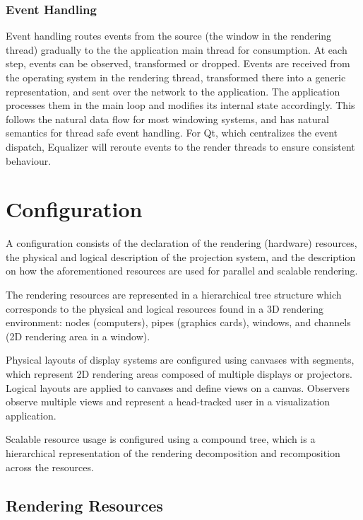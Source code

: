 \subsubsection{Event Handling}

Event handling routes events from the source (the window in the rendering
thread) gradually to the the application main thread for consumption. At each
step, events can be observed, transformed or dropped. Events are received from
the operating system in the rendering thread, transformed there into a generic
representation, and sent over the network to the application. The application
processes them in the main loop and modifies its internal state accordingly.
This follows the natural data flow for most windowing systems, and has natural
semantics for thread safe event handling. For Qt, which centralizes the event
dispatch, Equalizer will reroute events to the render threads to ensure
consistent behaviour.


\section{Configuration}

A configuration consists of the declaration of the rendering (hardware)
resources, the physical and logical  description of the projection system, and
the description on how the  aforementioned resources are used for parallel and
scalable rendering.

The rendering resources are represented in a hierarchical tree structure
which corresponds to the physical and logical resources found in a 3D
rendering environment: nodes (computers), pipes (graphics cards),
windows, and channels (2D rendering area in a window).

Physical layouts of display systems are configured using canvases with
segments, which represent 2D rendering areas composed of multiple
displays or projectors. Logical layouts are applied to canvases and
define views on a canvas. Observers observe multiple views and represent a head-tracked user in a visualization application.

Scalable resource usage is configured using a compound tree, which is a
hierarchical representation of the rendering decomposition and
recomposition across the resources.

\subsection{Rendering Resources}

